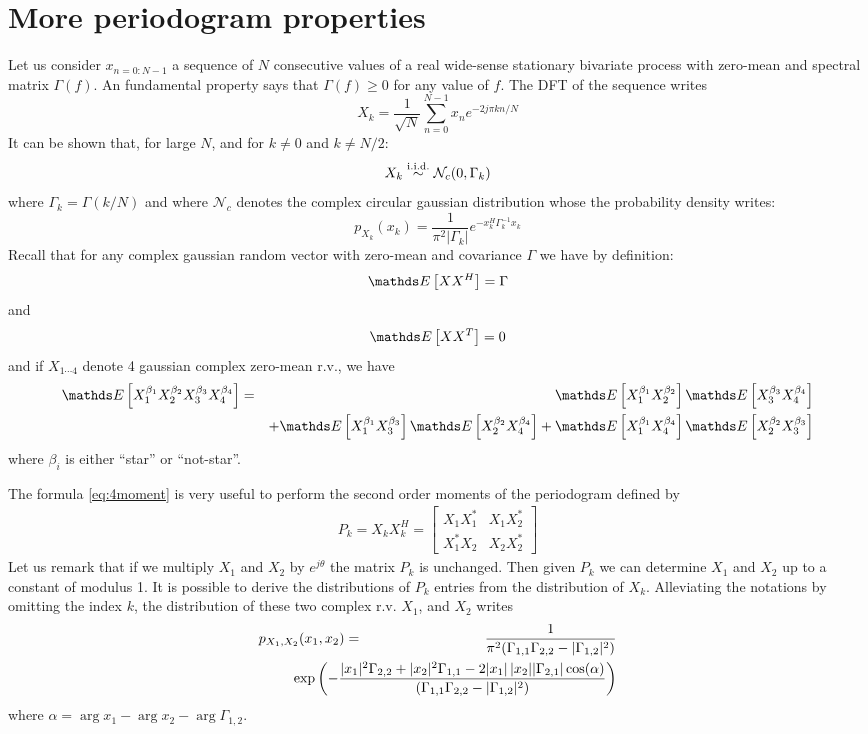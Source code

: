 \section{More periodogram properties}
\label{ann:peridogramproperties}
Let us consider $x_{n=0:N-1}$ a sequence of $N$ consecutive values of a real wide-sense stationary bivariate process with zero-mean and spectral matrix $\Gamma(f)$. An fundamental property says that $\Gamma(f)\geq 0$ for any value of $f$. The DFT of the sequence writes
$$
 X_{k}=\frac{1}{\sqrt{N}}\sum_{n=0}^{N-1}x_{n}e^{-2j\pi kn/N}
$$
It can be shown that, for large $N$, and for $k\neq 0$ and $k\neq N/2$:
$$
 X_{k}\stackrel{\mathrm{i.i.d.}}{\sim}\mathcal{N}_{c}(0,\Gamma_{k})
$$
where $\Gamma_{k}=\Gamma(k/N)$ and where $\mathcal{N}_{c}$ denotes the complex circular gaussian distribution whose the probability density writes:
$$
 p_{X_{k}}(x_{k}) = \frac{1}{\pi^{2} |\Gamma_{k}|}e^{-x_{k}^{H}\Gamma_{k}^{-1}x_{k}}
$$
Recall that for any complex gaussian random vector with zero-mean and covariance $\Gamma$ 
we have by definition:
$$
 \esp{XX^{H}} = \Gamma
$$
and
$$
 \esp{XX^{T}} = 0
$$
and if $X_{1\cdots 4}$ denote 4 gaussian complex zero-mean r.v., we have
\begin{eqnarray}
\label{eq:4moment}
\esp{X_{1}^{\beta_{1}}X_{2}^{\beta_{2}}X_{3}^{\beta_{3}}X_{4}^{\beta_{4}}}
&=&
 \esp{X_{1}^{\beta_{1}}X_{2}^{\beta_{2}}}\esp{X_{3}^{\beta_{3}}X_{4}^{\beta_{4}}}
\\
&& +\nonumber
 \esp{X_{1}^{\beta_{1}}X_{3}^{\beta_{3}}}\esp{X_{2}^{\beta_{2}}X_{4}^{\beta_{4}}}
 +
 \esp{X_{1}^{\beta_{1}}X_{4}^{\beta_{4}}}\esp{X_{2}^{\beta_{2}}X_{3}^{\beta_{3}}}
\end{eqnarray}
where $\beta_{i}$ is either ``star'' or ``not-star''.

The formula \eqref{eq:4moment} is very useful to perform the second order moments of the periodogram defined by 
\begin{eqnarray}
\label{eq:defperiodogram}
   P_{k}=X_{k}X_{k}^{H}=\begin{bmatrix}
   X_{1}X_{1}^{*}&X_{1}X_{2}^{*}
   \\
   X_{1}^{*}X_{2}&X_{2}X_{2}^{*}
   \end{bmatrix}
\end{eqnarray}
Let us remark that if we multiply $X_{1}$ and $X_{2}$ by $e^{j\theta}$ the matrix $P_{k}$ is unchanged. Then given $P_{k}$ we can determine $X_{1}$ and $X_{2}$ up to a constant of modulus 1.
It is possible to derive the distributions of $P_{k}$ entries from the distribution of $X_{k}$.
Alleviating the notations by omitting the index $k$, the distribution of these two complex r.v. $X_{1}$, and $X_{2}$ writes
\begin{eqnarray*}
 p_{X_{1},X_{2}}(x_{1},x_{2})
 &=&
 \frac{1}{\pi^{2} (\Gamma_{1,1}\Gamma_{2,2}-|\Gamma_{1,2}|^{2})}
 \\
 &&\hspace{-2cm}
 \exp\left(-
 \frac{
 |x_{1}|^{2}\Gamma_{2,2}+|x_{2}|^{2}\Gamma_{1,1}
 -2|x_{1}|\,|x_{2}||\Gamma_{2,1}|\cos(\alpha)}
 {(\Gamma_{1,1}\Gamma_{2,2}-|\Gamma_{1,2}|^{2})}
 \right)
\end{eqnarray*}
where $\alpha = \arg x_{1}-\arg x_{2}-\arg \Gamma_{1,2}$.

